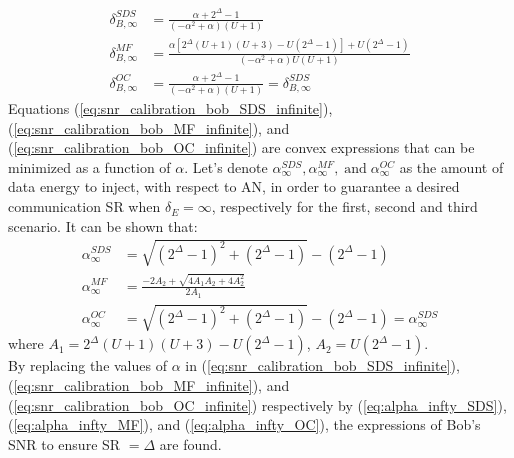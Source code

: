 \documentclass[journal,comsoc]{IEEEtran}
\begin{document}
\begin{align}
\delta_{B,\infty}^{SDS} &= \frac{\alpha + 2^\Delta - 1}{(-\alpha^2 + \alpha)(U+1)}
\label{eq:snr_calibration_bob_SDS_infinite} \\
\delta_{B,\infty}^{MF} &= \frac{\alpha\left[  2^\Delta(U+1)(U+3) - U(2^\Delta-1)  \right] + U(2^\Delta-1)}{(-\alpha^2 + \alpha)U(U+1)} 
\label{eq:snr_calibration_bob_MF_infinite}\\
\delta_{B,\infty}^{OC} &= \frac{\alpha + 2^\Delta - 1}{(-\alpha^2 + \alpha)(U+1)} = \delta_{B,\infty}^{SDS}
\label{eq:snr_calibration_bob_OC_infinite}
\end{align}
Equations  (\ref{eq:snr_calibration_bob_SDS_infinite}), (\ref{eq:snr_calibration_bob_MF_infinite}), and (\ref{eq:snr_calibration_bob_OC_infinite}) are convex expressions that can be minimized as a function of $\alpha$. Let's denote $\alpha_{\infty}^{SDS}, \alpha_{\infty}^{MF}, \; \text{and}\; \alpha_{\infty}^{OC}$ as the amount of data energy to inject, with respect to AN, in order to guarantee a desired communication SR when $\delta_E = \infty$, respectively for the first, second and third scenario. It can be shown that:
\begin{align}
	\alpha_{\infty}^{SDS} &= \sqrt{(2^\Delta -1)^2 + (2^\Delta -1)} - (2^\Delta -1)
	\label{eq:alpha_infty_SDS} \\
	\alpha_{\infty}^{MF} &= \frac{-2A_2+\sqrt{4A_1A_2 + 4A_2^2}}{2A_1} 
	\label{eq:alpha_infty_MF} \\
	\alpha_{\infty}^{OC} &= \sqrt{(2^\Delta -1)^2 + (2^\Delta -1)} - (2^\Delta -1) = \alpha_{\infty}^{SDS}
	\label{eq:alpha_infty_OC}
\end{align}
where $A_1 = 2^\Delta(U+1)(U+3)-U(2^\Delta-1)$, $A_2 = U(2^\Delta-1)$.\\
By replacing the values of $\alpha$ in (\ref{eq:snr_calibration_bob_SDS_infinite}), (\ref{eq:snr_calibration_bob_MF_infinite}), and (\ref{eq:snr_calibration_bob_OC_infinite}) respectively by (\ref{eq:alpha_infty_SDS}), (\ref{eq:alpha_infty_MF}), and (\ref{eq:alpha_infty_OC}), the expressions of Bob's SNR to ensure SR $=\Delta$ are found.









\end{document}
